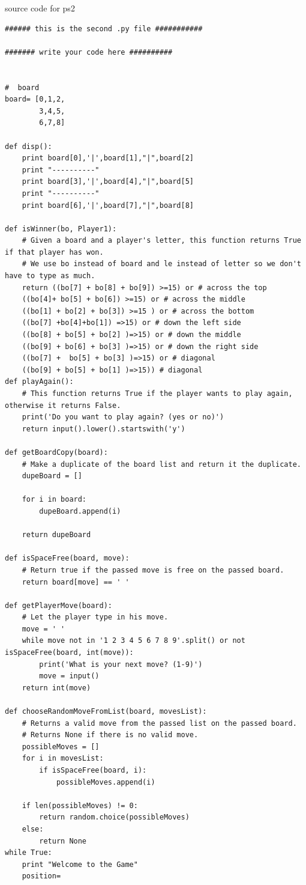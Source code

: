\documentclass[12pt]{article}
\begin{document}
source code for ps2
\begin{lstlisting}
###### this is the second .py file ###########

####### write your code here ##########


#  board
board= [0,1,2,
        3,4,5,
        6,7,8]

def disp():
	print board[0],'|',board[1],"|",board[2]
	print "----------"
	print board[3],'|',board[4],"|",board[5]
	print "----------"
	print board[6],'|',board[7],"|",board[8]

def isWinner(bo, Player1):
    # Given a board and a player's letter, this function returns True if that player has won.
    # We use bo instead of board and le instead of letter so we don't have to type as much.
    return ((bo[7] + bo[8] + bo[9]) >=15) or # across the top
    ((bo[4]+ bo[5] + bo[6]) >=15) or # across the middle
    ((bo[1] + bo[2] + bo[3]) >=15 ) or # across the bottom
    ((bo[7] +bo[4]+bo[1]) =>15) or # down the left side
    ((bo[8] + bo[5] + bo[2] )=>15) or # down the middle
    ((bo[9] + bo[6] + bo[3] )=>15) or # down the right side
    ((bo[7] +  bo[5] + bo[3] )=>15) or # diagonal
    ((bo[9] + bo[5] + bo[1] )=>15)) # diagonal
def playAgain():
    # This function returns True if the player wants to play again, otherwise it returns False.
    print('Do you want to play again? (yes or no)')
    return input().lower().startswith('y')

def getBoardCopy(board):
    # Make a duplicate of the board list and return it the duplicate.
    dupeBoard = []

    for i in board:
        dupeBoard.append(i)

    return dupeBoard

def isSpaceFree(board, move):
    # Return true if the passed move is free on the passed board.
    return board[move] == ' '

def getPlayerMove(board):
    # Let the player type in his move.
    move = ' '
    while move not in '1 2 3 4 5 6 7 8 9'.split() or not isSpaceFree(board, int(move)):
        print('What is your next move? (1-9)')
        move = input()
    return int(move)

def chooseRandomMoveFromList(board, movesList):
    # Returns a valid move from the passed list on the passed board.
    # Returns None if there is no valid move.
    possibleMoves = []
    for i in movesList:
        if isSpaceFree(board, i):
            possibleMoves.append(i)

    if len(possibleMoves) != 0:
        return random.choice(possibleMoves)
    else:
        return None
while True:
	print "Welcome to the Game"
	position= 
\end{lstlisting}
\end{document}
